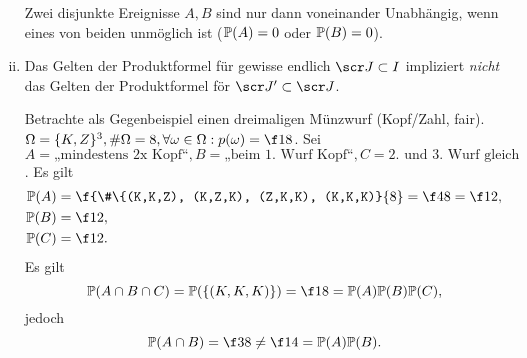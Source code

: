 \begin{nt}
\begin{enumerate}[(i)]
			Zwei disjunkte Ereignisse $A,B$ sind nur dann voneinander Unabhängig, wenn eines von beiden unmöglich ist ($\P(A) = 0$ oder $\P(B) = 0$).
		\item
			Das Gelten der Produktformel für gewisse endlich $\scr J \subset I$ impliziert \emph{nicht} das Gelten der Produktformel för $\scr J' \subset \scr J$.

			Betrachte als Gegenbeispiel einen dreimaligen Münzwurf (Kopf/Zahl, fair).
			$\Omega = \{K, Z\}^3, \#\Omega = 8, \forall \omega \in \Omega : p(\omega) = \f 18$.
			Sei $A = \text{„mindestens 2x Kopf“}, B = \text{„beim 1. Wurf Kopf“}, C = \text{2. und 3. Wurf gleich}$.
			Es gilt
			\begin{align*}
				\P(A)
				&= \f {\#\{(K,K,Z), (K,Z,K), (Z,K,K), (K,K,K)}{8}
				= \f 48
				= \f 12, \\
				\P(B)
				&= \f 12, \\
				\P(C)
				&= \f 12.
			\end{align*}
			Es gilt
			\[
				\P(A\cap B \cap C)
				= \P(\{(K,K,K)\})
				= \f 18
				= \P(A) \P(B) \P(C),
			\]
			jedoch
			\[
				\P(A \cap B)
				= \f 38
				\neq \f 14
				= \P(A) \P(B).
			\]
	\end{enumerate}
\end{nt}
